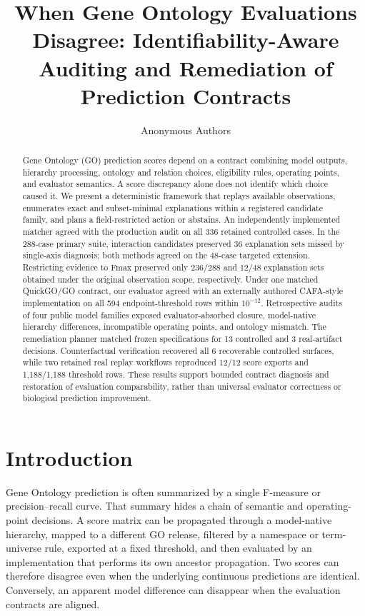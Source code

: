 \documentclass[11pt]{article}
\title{When Gene Ontology Evaluations Disagree: Identifiability-Aware Auditing and Remediation of Prediction Contracts}
\author{Anonymous Authors}
\date{}
\begin{document}
\maketitle
\begin{abstract}
Gene Ontology (GO) prediction scores depend on a contract combining model outputs, hierarchy processing, ontology and relation choices, eligibility rules, operating points, and evaluator semantics. A score discrepancy alone does not identify which choice caused it. We present a deterministic framework that replays available observations, enumerates exact and subset-minimal explanations within a registered candidate family, and plans a field-restricted action or abstains. An independently implemented matcher agreed with the production audit on all 336 retained controlled cases. In the 288-case primary suite, interaction candidates preserved 36 explanation sets missed by single-axis diagnosis; both methods agreed on the 48-case targeted extension. Restricting evidence to Fmax preserved only 236/288 and 12/48 explanation sets obtained under the original observation scope, respectively. Under one matched QuickGO/GO contract, our evaluator agreed with an externally authored CAFA-style implementation on all 594 endpoint-threshold rows within $10^{-12}$. Retrospective audits of four public model families exposed evaluator-absorbed closure, model-native hierarchy differences, incompatible operating points, and ontology mismatch. The remediation planner matched frozen specifications for 13 controlled and 3 real-artifact decisions. Counterfactual verification recovered all 6 recoverable controlled surfaces, while two retained real replay workflows reproduced 12/12 score exports and 1,188/1,188 threshold rows. These results support bounded contract diagnosis and restoration of evaluation comparability, rather than universal evaluator correctness or biological prediction improvement.
\end{abstract}


\section{Introduction}

Gene Ontology prediction is often summarized by a single F-measure or precision--recall curve. That summary hides a chain of semantic and operating-point decisions. A score matrix can be propagated through a model-native hierarchy, mapped to a different GO release, filtered by a namespace or term-universe rule, exported at a fixed threshold, and then evaluated by an implementation that performs its own ancestor propagation. Two scores can therefore disagree even when the underlying continuous predictions are identical. Conversely, an apparent model difference can disappear when the evaluation contracts are aligned.
\end{document}
